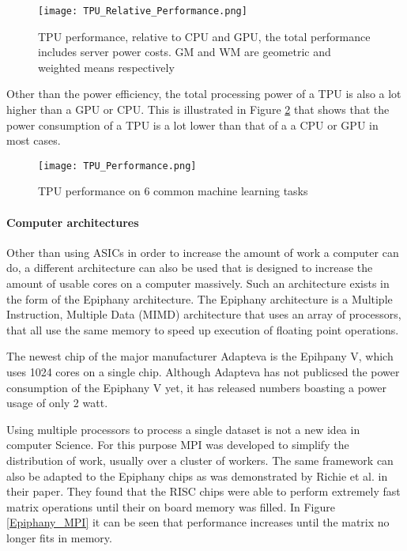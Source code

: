 \begin{figure}
  \texttt{[image: TPU\_Relative\_Performance.png]}
  \caption{TPU performance, relative to CPU and GPU, the total performance includes server power costs. GM and WM are geometric and weighted means respectively \cite{Joup17}}
  \label{TPU_Relative_Performance}
\end{figure}

Other than the power efficiency, the total processing power of a TPU is also a lot higher
than a GPU or CPU. This is illustrated in Figure \ref{TPU_Performance} that shows that the 
power consumption of a TPU is a lot lower than that of a a CPU or GPU in most cases.

\begin{figure}
  \texttt{[image: TPU\_Performance.png]}
  \caption{TPU performance on 6 common machine learning tasks\cite{Sato17}}
  \label{TPU_Performance}
\end{figure}


\paragraph{Computer architectures}
Other than using ASICs in order to increase the amount of work a computer can do,
a different architecture can also be used that is designed to increase the amount
of usable cores on a computer massively. Such an architecture exists in the form
of the Epiphany architecture. The Epiphany architecture is a Multiple Instruction,
Multiple Data (MIMD) architecture that uses an array of processors, that all use the
same memory to speed up execution of floating point operations\cite{Olof16}.

The newest chip of the major manufacturer Adapteva is the Epihpany V, which uses
1024 cores on a single chip\cite{Olof16}. Although Adapteva has not publicsed the power consumption of the Epiphany V yet,
it has released numbers boasting a power usage of only 2 watt\cite{Adap}.

Using multiple processors to process a single dataset is not a new idea in computer
Science. For this purpose MPI was developed to simplify the distribution of work,
usually over a cluster of workers. The same framework can also be adapted to the
Epiphany chips as was demonstrated by Richie et al. in their paper. They found that
the RISC chips were able to perform extremely fast matrix operations until their on board
memory was filled\cite{Rich15}. In Figure \ref{Epiphany_MPI} it can be seen that performance increases
until the matrix no longer fits in memory.

